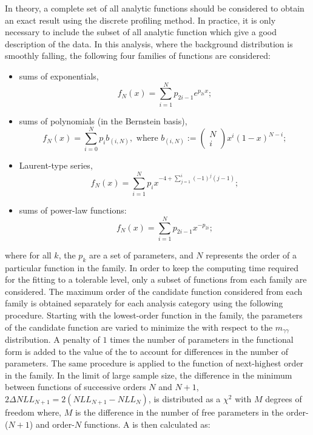 In theory, a complete set of all analytic functions should be considered to obtain an exact result using the discrete profiling method. In practice, it is only necessary to include the subset of all analytic function which give a good description of the data. In this analysis, where the background distribution is smoothly falling, the following four families of functions are considered:
\begin{itemize}
\item sums of exponentials, $$ f_{N}(x)= \sum^{N}_{i=1} p_{2i-1} e^{p_{2i} x} ;$$
\item sums of polynomials (in the Bernstein basis), $$ f_{N}(x) = \sum^{N}_{i=0} p_{i} b_{(i,N)}, \text{ where } b_{(i,N)}:= \begin{pmatrix} N \\ i \end{pmatrix} x^i (1-x)^{N-i} ;$$
\item Laurent-type series, $$ f_{N}(x)= \sum^{N}_{i=1} p_{i} x^{-4 + \sum^{i}_{j=1} (-1)^{j} (j-1)};$$
\item sums of power-law functions: $$ f_{N}(x)= \sum^{N}_{i=1} p_{2i-1} x^{-p_{2i}};$$
\end{itemize}
where for all $k$, the $p_k$ are a set of parameters, and $N$ represents the order of a particular function in the family. 
In order to keep the computing time required for the fitting to a tolerable level, only a subset of functions from each family are considered. The maximum order of the candidate function considered from each family is obtained separately for each analysis category using the following procedure. Starting with the lowest-order function in the family, the parameters of the candidate function are varied to minimize the \NLL with respect to the $m_{\gamma\gamma}$ distribution. A penalty of $1$ times the number of parameters in the functional form is added to the value of the \NLL to account for differences in the number of parameters. The same procedure is applied to the function of next-highest order in the family. 
In the limit of large sample size, the difference in the minimum \NLL between functions of successive orders $N$ and $N+1$, $2 \Delta NLL_{N+1} = 2(NLL_{N+1} - NLL_{N})$, is distributed as a $\chi^2$ with $M$ degrees of freedom where, $M$ is the difference in the number of free parameters in the order-($N+1$) and order-$N$ functions. A \pvalue is then calculated as:

